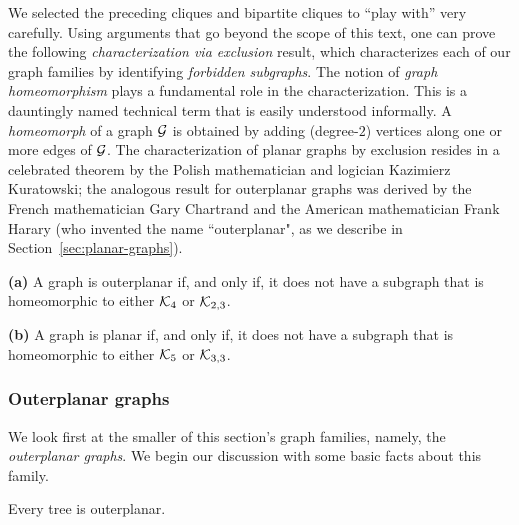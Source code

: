 We selected the preceding cliques and bipartite cliques to ``play with'' very carefully.
Using arguments that go beyond the scope of this text, one can prove the following
{\em characterization via exclusion} result, which characterizes each of our graph families by
identifying {\it forbidden subgraphs}.  
The notion of {\it graph homeomorphism} plays a fundamental role in the characterization.
This is a dauntingly named technical term that is easily understood informally.
A {\it homeomorph} of a graph $\mbox{$\cal G$}$ is obtained by adding (degree-$2$) vertices along one
or more edges of $\mbox{$\cal G$}$.  The characterization of planar graphs by exclusion resides in a
celebrated theorem by the Polish mathematician and logician Kazimierz Kuratowski; the
analogous result for outerplanar graphs was derived by the French mathematician Gary
Chartrand and the American mathematician Frank Harary (who invented the name ``outerplanar", as
we describe in Section~\ref{sec:planar-graphs}).
 
\begin{theorem}
\label{thm:planar+outerplanar-exclusion}
{\bf (a)} {\rm \cite{ChartrandB67}}
A graph is outerplanar if, and only if, it does not have a subgraph
that is homeomorphic to either $\mbox{$\cal K$}_4$ or $\mbox{$\cal K$}_{2,3}$.

{\bf (b)} {\rm \cite{Kuratowski30}}
A graph is planar if, and only if, it does not have a subgraph
that is homeomorphic to either $\mbox{$\cal K$}_5$ or $\mbox{$\cal K$}_{3,3}$.
\end{theorem}


\subsubsection{Outerplanar graphs}

We look first at the smaller of this section's graph families, namely,
the {\it outerplanar graphs}. 
We begin our discussion with some basic facts about this family.

\begin{prop}
Every tree is outerplanar.
\end{prop}

